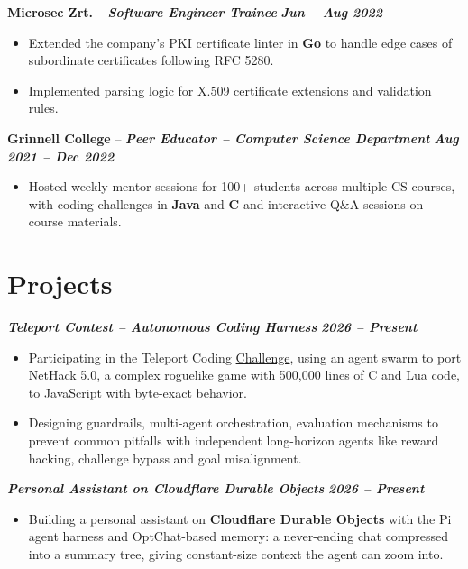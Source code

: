\documentclass[11pt,a4paper]{article}
\newcommand{\experienceheader}[3]{%
    \Needspace{7\baselineskip}%
    \noindent\textbf{#1} -- \textbf{\textit{#2}} \hfill \textbf{\textit{#3}}%
}
\newcommand{\projectheader}[2]{%
    \Needspace{7\baselineskip}%
    \noindent\textbf{\textit{#1}} \hfill \textbf{\textit{#2}}%
}
\begin{document}
\vspace{8pt}

\experienceheader{Microsec Zrt.}{Software Engineer Trainee}{Jun -- Aug 2022}
\begin{itemize}
    \item Extended the company's PKI certificate linter in \textbf{Go} to handle edge cases of subordinate certificates following RFC 5280.
    \item Implemented parsing logic for X.509 certificate extensions and validation rules.
\end{itemize}

\vspace{8pt}

\experienceheader{Grinnell College}{Peer Educator -- Computer Science Department}{Aug 2021 -- Dec 2022}
\begin{itemize}
    \item Hosted weekly mentor sessions for 100+ students across multiple CS courses, with coding challenges in \textbf{Java} and \textbf{C} and interactive Q\&A sessions on course materials.
\end{itemize}

\section{Projects}

\projectheader{Teleport Contest -- Autonomous Coding Harness}{2026 -- Present}
\begin{itemize}
    \item Participating in the Teleport Coding \href{https://mazesofmenace.ai/}{Challenge}, using an agent swarm to port NetHack 5.0, a complex roguelike game with 500,000 lines of C and Lua code, to JavaScript with byte-exact behavior.
    \item Designing guardrails, multi-agent orchestration, evaluation mechanisms to prevent common pitfalls with independent long-horizon agents like reward hacking, challenge bypass and goal misalignment.
\end{itemize}

\vspace{8pt}

\projectheader{Personal Assistant on Cloudflare Durable Objects}{2026 -- Present}
\begin{itemize}
    \item Building a personal assistant on \textbf{Cloudflare Durable Objects} with the Pi agent harness and OptChat-based memory: a never-ending chat compressed into a summary tree, giving constant-size context the agent can zoom into.
\end{itemize}
\end{document}
